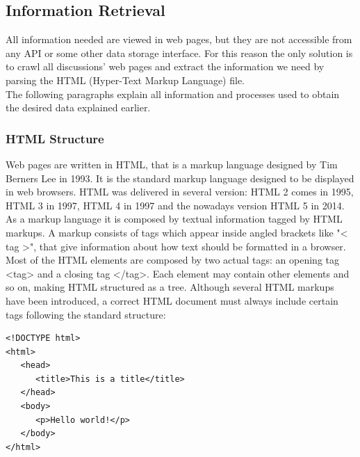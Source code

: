 \subsection{Information Retrieval}

All information needed are viewed in web pages, but they are not accessible from any API or some other data storage interface. For this reason the only solution is to crawl all discussions' web pages and extract the information we need by parsing the HTML (Hyper-Text Markup Language) file. \\
The following paragraphs explain all information and processes used to obtain the desired data explained earlier.

\subsubsection{HTML Structure}

Web pages are written in HTML, that is a markup language designed by Tim Berners Lee in 1993. It is the standard markup language designed to be displayed in web browsers. HTML was delivered in several version: HTML 2 comes in 1995, HTML 3 in 1997, HTML 4 in 1997 and the nowadays version HTML 5 in 2014. \\
As a markup language it is composed by textual information tagged by HTML markups. A markup consists of tags which appear inside angled brackets  like "< tag >", that give information about how text should be formatted in a browser.	Most of the HTML elements are composed by two actual tags: an opening tag <tag> and a closing tag </tag>. Each element may contain other elements and so on, making HTML structured as a tree. Although several HTML markups have been introduced, a correct HTML document must always include certain tags following the standard structure:

\begin{center}
\begin{lstlisting}
<!DOCTYPE html>
<html>
   <head>
      <title>This is a title</title>
   </head>
   <body>
      <p>Hello world!</p>
   </body>
</html>
\end{lstlisting}
\end{center}

